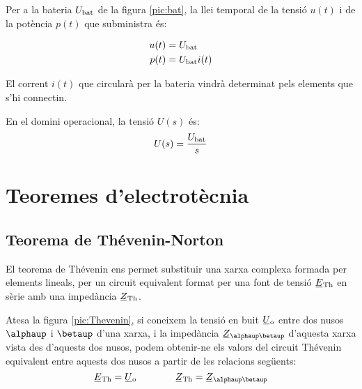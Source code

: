 Per a la bateria $U_\mathrm{bat}$ de la figura
\vref{pic:bat}, la llei temporal de la tensió $u(t)$ i de la
potència $p(t)$ que subministra és:

\hfill
\begin{minipage}[b]{5cm}
	
	\label{pic:bat}
\end{minipage}
\hfill
\begin{minipage}[b][3cm][t]{8cm}
	\begin{align}
		u(t) &= U_\mathrm{bat} \\  p(t) &= U_\mathrm{bat} i(t)
	\end{align}
\end{minipage}


El corrent $i(t)$ que circularà per la bateria vindrà determinat
pels elements que s'hi connectin.

 En el domini operacional, la
tensió $U(s)$ és:
\begin{equation}
	U(s) = \frac{U_\mathrm{bat}}{s}
\end{equation}



\section{Teoremes d'electrotècnia}\label{sec:teoremes}

\subsection{\texorpdfstring{Teorema de Thévenin-Norton}{Teorema de
            Thévenin-Norton}}\label{sec:T_N}

El teorema de Thévenin ens permet
substituir una xarxa complexa formada per elements lineals, per un
circuit equivalent format per una font de tensió $\cmplx{E}\ped{Th}$
en sèrie amb una impedància $\cmplx{Z}\ped{Th}$.


Atesa la figura \vref{pic:Thevenin}, si coneixem la tensió en
buit $\cmplx{U}\ped{o}$ entre dos nusos $\alphaup$ i $\betaup$ d'una
xarxa, i la impedància $\cmplx{Z}_{\alphaup\betaup}$ d'aquesta xarxa
vista des d'aquests dos nusos, podem obtenir-ne els valors del circuit
Thévenin equivalent entre aquests dos nusos a partir de les
relacions següents:
\begin{equation}
   \cmplx{E}\ped{Th} = \cmplx{U}\ped{o} \qquad\qquad  \cmplx{Z}\ped{Th} = \cmplx{Z}_{\alphaup\betaup}
\end{equation}

